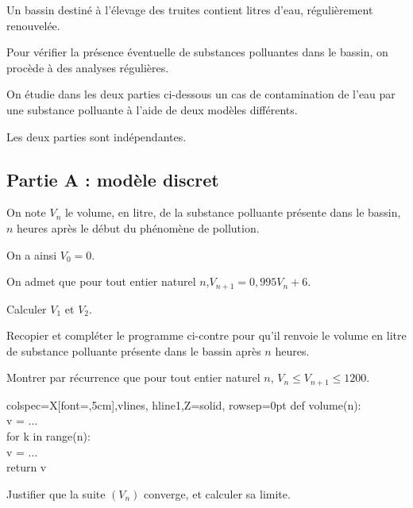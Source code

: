 Un bassin destiné à l'élevage des truites contient  litres d'eau, régulièrement renouvelée.

	Pour vérifier la présence éventuelle de substances polluantes dans le bassin, on procède à des analyses régulières.

	On étudie dans les deux parties ci-dessous un cas de contamination de l'eau par une substance polluante à l'aide de deux modèles différents.

	Les deux parties sont indépendantes.

	\subsection*{\centering Partie A : modèle discret}

		On note $V_{n}$ le volume, en litre, de la substance polluante présente dans le bassin, $n$ heures après le début du phénomène de pollution.

		On a ainsi \quad $V_{0}=0$.

		On admet que pour tout entier naturel $n$,\quad $V_{n+1}=0,995 V_{n}+6$.

		\begin{enumerate}
			\item Calculer $V_{1}$ et $V_{2}$.

			\item \begin{minipage}[t]{0.55\linewidth}
				Recopier et compléter le programme ci-contre pour qu'il renvoie le volume en litre de substance polluante présente dans le bassin après $n$ heures.
				\item Montrer par récurrence que pour tout entier naturel $n$,  $V_{n} \leqslant  V_{n+1} \leqslant  1200$.

			\end{minipage}\hfill
			\begin{tblr}[T]{colspec={X[font=\ttfamily,5cm]},vlines, hline{1,Z}={solid}, rowsep=0pt}
				def volume(n):\\
				\quad v = ...\\
				\quad for k in range(n):\\
				\quad \quad	v = ...\\
				\quad return v\\
			\end{tblr}


			\item Justifier que la suite $(V_{n})$ converge, et calculer sa limite.
		\end{enumerate}


